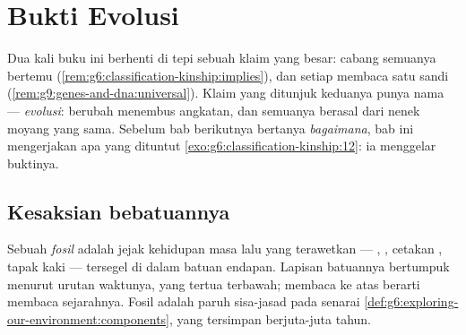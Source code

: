 \chapter{Bukti Evolusi}\label{ch:g9:evidence-of-evolution}

Dua kali buku ini berhenti di tepi sebuah klaim yang besar:
cabang  semuanya bertemu
(\cref{rem:g6:classification-kinship:implies}), dan setiap
 membaca satu sandi
(\cref{rem:g9:genes-and-dna:universal}). Klaim yang ditunjuk
keduanya punya nama --- \emph{evolusi}:  berubah
menembus angkatan, dan semuanya berasal dari nenek moyang
yang sama. Sebelum bab berikutnya bertanya
\emph{bagaimana}, bab ini mengerjakan apa yang dituntut
\cref{exo:g6:classification-kinship:12}: ia menggelar buktinya.

\section{Kesaksian bebatuannya}

\begin{definition}[Fosil]\label{def:g9:evidence-of-evolution:fossils}
Sebuah \emph{fosil} adalah jejak kehidupan masa
lalu yang terawetkan --- , , cetakan ,
tapak kaki --- tersegel di dalam batuan endapan. Lapisan
batuannya bertumpuk menurut urutan waktunya, yang tertua
terbawah; membaca ke atas berarti membaca sejarahnya. Fosil
adalah paruh sisa-jasad pada senarai
\cref{def:g6:exploring-our-environment:components}, yang
tersimpan berjuta-juta tahun.
\end{definition}

